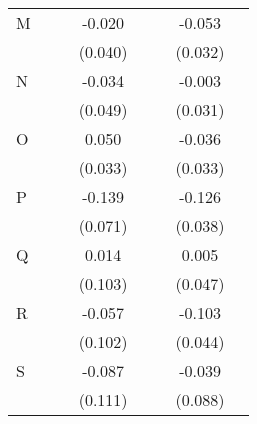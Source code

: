 \begin{longtable}{l*{3}{c}|l*{3}{c}}
	M                   &                     &                     &      -0.020         &                     &                     &      -0.053\sym{*}  \\
	&                     &                     &     (0.040)         &                     &                     &     (0.032)         \\
	N                   &                     &                     &      -0.034         &                     &                     &      -0.003         \\
	&                     &                     &     (0.049)         &                     &                     &     (0.031)         \\
	O                   &                     &                     &       0.050         &                     &                     &      -0.036         \\
	&                     &                     &     (0.033)         &                     &                     &     (0.033)         \\
	P                   &                     &                     &      -0.139\sym{**} &                     &                     &      -0.126\sym{***}\\
	&                     &                     &     (0.071)         &                     &                     &     (0.038)         \\
	Q                   &                     &                     &       0.014         &                     &                     &       0.005         \\
	&                     &                     &     (0.103)         &                     &                     &     (0.047)         \\
	R                   &                     &                     &      -0.057         &                     &                     &      -0.103\sym{**} \\
	&                     &                     &     (0.102)         &                     &                     &     (0.044)         \\
	S                   &                     &                     &      -0.087         &                     &                     &      -0.039         \\
	&                     &                     &     (0.111)         &                     &                     &     (0.088)         \\

\end{longtable}
